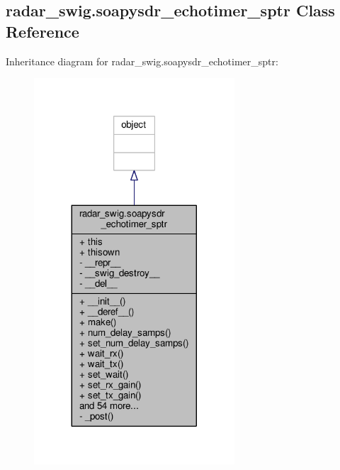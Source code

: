 \subsection{radar\+\_\+swig.\+soapysdr\+\_\+echotimer\+\_\+sptr Class Reference}
\label{classradar__swig_1_1soapysdr__echotimer__sptr}


Inheritance diagram for radar\+\_\+swig.\+soapysdr\+\_\+echotimer\+\_\+sptr\+:
\nopagebreak
\begin{figure}[H]
\begin{center}
\leavevmode
\includegraphics[width=212pt]{d2/df3/classradar__swig_1_1soapysdr__echotimer__sptr__inherit__graph}
\end{center}
\end{figure}


